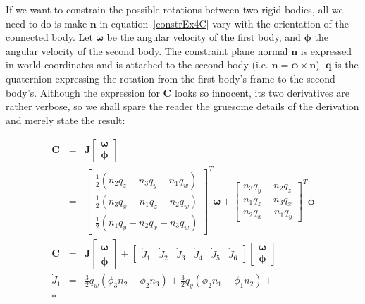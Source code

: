 If we want to constrain the possible rotations between two rigid bodies, all we need to do is make
$\mathbf{n}$ in equation~\ref{constrEx4C} vary with the orientation of the connected body.
Let $\bm{\omega}$ be the angular velocity of the first body, and $\bm{\phi}$ the angular velocity
of the second body. The constraint plane normal $\mathbf{n}$ is expressed in world coordinates and
is attached to the second body (i.e. $\dot{\mathbf{n}} = \bm{\phi}\times\mathbf{n}$). $\mathbf{q}$
is the quaternion expressing the rotation from the first body's frame to the second body's.
Although the expression for $\mathbf{C}$ looks so innocent, its two derivatives are rather
verbose, so we shall spare the reader the gruesome details of the derivation and merely state the
result:

\begin{eqnarray}
\dot{\mathbf{C}} &=& \mathbf{J}\left[\begin{array}{c} \bm{\omega}\\\bm{\phi} \end{array}\right] \\
&=& \left[\begin{array}{c}
        \frac{1}{2}( n_2 q_z - n_3 q_y - n_1 q_w) \\
        \frac{1}{2}( n_3 q_x - n_1 q_z - n_2 q_w) \\
        \frac{1}{2}( n_1 q_y - n_2 q_x - n_3 q_w)
    \end{array}\right]^T \bm{\omega} +
    \left[\begin{array}{c}
        n_3 q_y - n_2 q_z \\ n_1 q_z - n_3 q_x \\ n_2 q_x - n_1 q_y
    \end{array}\right]^T \bm{\phi} \nonumber \\
\ddot{\mathbf{C}} &=& \mathbf{J}
    \left[\begin{array}{c} \dot{\bm{\omega}}\\\dot{\bm{\phi}} \end{array}\right] +
    \left[\begin{array}{cccccc} \dot{J}_1 & \dot{J}_2 & \dot{J}_3 & \dot{J}_4 &
        \dot{J}_5 & \dot{J}_6 \end{array}\right]
    \left[\begin{array}{c} \bm{\omega}\\\bm{\phi} \end{array}\right] \\
\dot{J}_1 & = & \frac{3}{2} q_w (\phi_3 n_2 - \phi_2 n_3) +
                \frac{3}{2} q_y (\phi_2 n_1 - \phi_1 n_2) + \nonumber\\*&&

\end{eqnarray}
